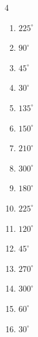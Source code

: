 \begin{multicols}{4}
\begin{enumerate}
  \item $\displaystyle 225^{\circ}$

\columnbreak %

  \item $\displaystyle 90^{\circ}$

  \item $\displaystyle 45^{\circ}$

  \item $\displaystyle 30^{\circ}$

  \item $\displaystyle 135^{\circ}$

  \item $\displaystyle 150^{\circ}$

  \item $\displaystyle 210^{\circ}$

  \item $\displaystyle 300^{\circ}$

  \item $\displaystyle 180^{\circ}$
        \phantom{$\displaystyle =\pi$}

  \item $\displaystyle 225^{\circ}$

  \item $\displaystyle 120^{\circ}$

  \item $\displaystyle 45^{\circ}$

  \item $\displaystyle 270^{\circ}$

  \item $\displaystyle 300^{\circ}$

  \item $\displaystyle 60^{\circ}$

  \item $\displaystyle 30^{\circ}$


\end{enumerate}
\end{multicols}
